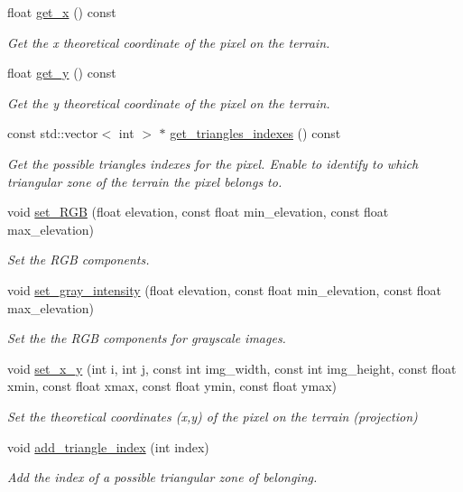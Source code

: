 \begin{DoxyCompactItemize}
float \hyperlink{classPixel_a07decaf3ba6ff526c8fa53fd730e9705}{get\+\_\+x} () const
\begin{DoxyCompactList}\small\item\em Get the x theoretical coordinate of the pixel on the terrain. \end{DoxyCompactList}\item 
float \hyperlink{classPixel_a6fcdc22470b74d9c1f704d0e670176ca}{get\+\_\+y} () const
\begin{DoxyCompactList}\small\item\em Get the y theoretical coordinate of the pixel on the terrain. \end{DoxyCompactList}\item 
const std\+::vector$<$ int $>$ $\ast$ \hyperlink{classPixel_a93366a506c032d97b25230469f0ca507}{get\+\_\+triangles\+\_\+indexes} () const
\begin{DoxyCompactList}\small\item\em Get the possible triangles\textquotesingle{} indexes for the pixel. Enable to identify to which triangular zone of the terrain the pixel belongs to. \end{DoxyCompactList}\item 
void \hyperlink{classPixel_a209745683886a3ccffd14e960edbed6c}{set\+\_\+\+R\+GB} (float elevation, const float min\+\_\+elevation, const float max\+\_\+elevation)
\begin{DoxyCompactList}\small\item\em Set the R\+GB components. \end{DoxyCompactList}\item 
void \hyperlink{classPixel_a51eafb0e5972c7f0f435354247a56966}{set\+\_\+gray\+\_\+intensity} (float elevation, const float min\+\_\+elevation, const float max\+\_\+elevation)
\begin{DoxyCompactList}\small\item\em Set the the R\+GB components for grayscale images. \end{DoxyCompactList}\item 
void \hyperlink{classPixel_af3245cdbe500abac1ff2af1575c5770f}{set\+\_\+x\+\_\+y} (int i, int j, const int img\+\_\+width, const int img\+\_\+height, const float xmin, const float xmax, const float ymin, const float ymax)
\begin{DoxyCompactList}\small\item\em Set the theoretical coordinates (x,y) of the pixel on the terrain (projection) \end{DoxyCompactList}\item 
void \hyperlink{classPixel_a9adc1965e90a981eb8723087b41a87cd}{add\+\_\+triangle\+\_\+index} (int index)
\begin{DoxyCompactList}\small\item\em Add the index of a possible triangular zone of belonging. \end{DoxyCompactList}\end{DoxyCompactItemize}



